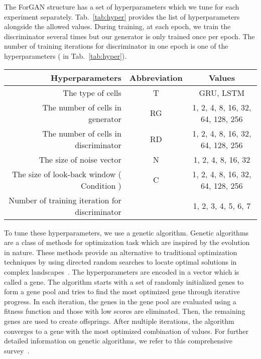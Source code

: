 \documentclass{ieeeaccess}
\begin{document}
The ForGAN structure has a set of hyperparameters which we tune for each experiment separately. Tab.~\ref{tab:hyper} provides the list of hyperparameters alongside the allowed values. During training, at each epoch, we train the discriminator several times but our generator is only trained once per epoch. The number of training iterations for discriminator in one epoch is one of the hyperparameters  ( in Tab.~\ref{tab:hyper}).
\begin{table*}
	\centering
	\caption{The List of ForGAN hyperparameters alongside the range of allowed values.}
	\begin{tabular}{rcc}
		\toprule
		\textbf{Hyperparameters}                       & \textbf{Abbreviation}      &   \textbf{Values}\\
		\midrule
		The type of cells                          & T                       & GRU, LSTM\\
		The number of cells in generator           & RG                       & 1, 2, 4, 8, 16, 32, 64, 128, 256\\
		The number of cells in discriminator       & RD                      & 1, 2, 4, 8, 16, 32, 64, 128, 256\\
		The size of noise vector                       & N                      & 1, 2, 4, 8, 16, 32\\
		The size of look-back window ( Condition )     & C                     & 1, 2, 4, 8, 16, 32, 64, 128, 256\\
		Number of training iteration for discriminator &  & 1, 2, 3, 4, 5, 6, 7\\
		\bottomrule
	\end{tabular}
	\label{tab:hyper}
\end{table*}
To tune these hyperparameters, we use a genetic algorithm. Genetic algorithms~\cite{holland1992adaptation} are a class of methods for optimization task which are inspired by the evolution in nature. These methods provide an alternative to traditional optimization techniques by using directed random searches to locate optimal solutions in complex landscapes~\cite{srinivas1994genetic}. The hyperparameters are encoded in a vector which is called a gene. The algorithm starts with a set of randomly initialized genes to form a gene pool and tries to find the most optimized gene through iterative progress. In each iteration, the genes in the gene pool are evaluated using a fitness function and those with low scores are eliminated. Then, the remaining genes are used to create offsprings. After multiple iterations, the algorithm converges to a gene with the most optimized combination of values. For further detailed information on genetic algorithms, we refer to this comprehensive survey~\cite{srinivas1994genetic}.
\end{document}
